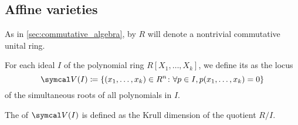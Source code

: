 \subsection{Affine varieties}\label{subsec:affine_varieties}

As in \cref{sec:commutative_algebra}, by \( R \) will denote a nontrivial commutative unital ring.

\begin{definition}\label{def:affine_variety}\cite[69]{Коцев2016}
  For each ideal \( I \) of the polynomial ring \( R[X_1, \ldots, X_k] \), we define its  as the locus
  \begin{equation*}
    \Cal{V}(I) \coloneqq \{ (x_1, \ldots, x_k) \in R^n \colon \forall p \in I, p(x_1, \ldots, x_k) = 0 \}
  \end{equation*}
  of the simultaneous roots of all polynomials in \( I \).

  The  of \( \Cal{V}(I) \) is defined as the Krull dimension of the quotient \( R / I \).
\end{definition}

